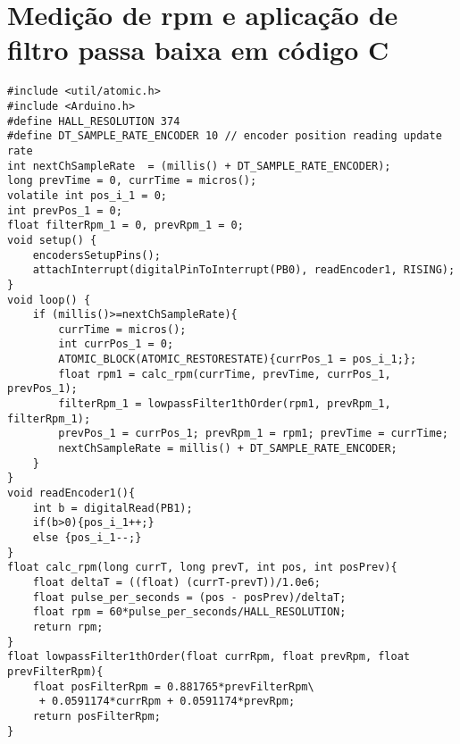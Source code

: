 

\chapter{Medição de rpm e aplicação de filtro passa baixa em código C \label{anx_passa_baixa}}

\lstset{language=C}
\begin{lstlisting}
#include <util/atomic.h>
#include <Arduino.h>
#define HALL_RESOLUTION 374
#define DT_SAMPLE_RATE_ENCODER 10 // encoder position reading update rate
int nextChSampleRate  = (millis() + DT_SAMPLE_RATE_ENCODER);
long prevTime = 0, currTime = micros();
volatile int pos_i_1 = 0;
int prevPos_1 = 0;
float filterRpm_1 = 0, prevRpm_1 = 0;
void setup() {
    encodersSetupPins();
    attachInterrupt(digitalPinToInterrupt(PB0), readEncoder1, RISING);   
}
void loop() {
    if (millis()>=nextChSampleRate){
        currTime = micros();
        int currPos_1 = 0;
        ATOMIC_BLOCK(ATOMIC_RESTORESTATE){currPos_1 = pos_i_1;};
        float rpm1 = calc_rpm(currTime, prevTime, currPos_1, prevPos_1);
        filterRpm_1 = lowpassFilter1thOrder(rpm1, prevRpm_1, filterRpm_1);
        prevPos_1 = currPos_1; prevRpm_1 = rpm1; prevTime = currTime;
        nextChSampleRate = millis() + DT_SAMPLE_RATE_ENCODER;
    }
}
void readEncoder1(){ 
    int b = digitalRead(PB1);
    if(b>0){pos_i_1++;}
    else {pos_i_1--;}
}
float calc_rpm(long currT, long prevT, int pos, int posPrev){
    float deltaT = ((float) (currT-prevT))/1.0e6;
    float pulse_per_seconds = (pos - posPrev)/deltaT;
    float rpm = 60*pulse_per_seconds/HALL_RESOLUTION;
    return rpm;
}
float lowpassFilter1thOrder(float currRpm, float prevRpm, float prevFilterRpm){
    float posFilterRpm = 0.881765*prevFilterRpm\
	 + 0.0591174*currRpm + 0.0591174*prevRpm;
    return posFilterRpm;
}
\end{lstlisting}